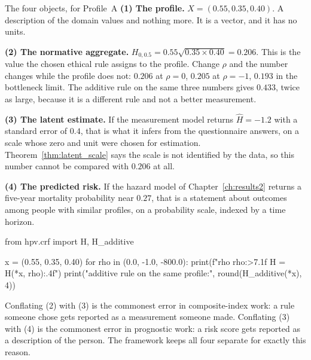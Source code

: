 \begin{workedexample}{The four objects, for Profile~A}
\textbf{(1) The profile.} $X=(0.55,0.35,0.40)$. A description of the domain
values and nothing more. It is a vector, and it has no units.

\textbf{(2) The normative aggregate.} $H_{0,0.5}=0.55\sqrt{0.35\times0.40}
=0.206$. This is the value the chosen ethical rule assigns to the profile.
Change $\rho$ and the number changes while the profile does not: $0.206$ at
$\rho=0$, $0.205$ at $\rho=-1$, $0.193$ in the bottleneck limit. The additive
rule on the same three numbers gives $0.433$, twice as large, because it is a
different rule and not a better measurement.

\textbf{(3) The latent estimate.} If the measurement model returns
$\widehat H=-1.2$ with a standard error of $0.4$, that is what it infers from
the questionnaire answers, on a scale whose zero and unit were chosen for
estimation. Theorem~\ref{thm:latent_scale} says the scale is not identified by
the data, so this number cannot be compared with $0.206$ at all.

\textbf{(4) The predicted risk.} If the hazard model of
Chapter~\ref{ch:results2} returns a five-year mortality probability near
$0.27$, that is a statement about outcomes among people with similar profiles, on
a probability scale, indexed by a time horizon.

\begin{wecode}[Python]
from hpv.crf import H, H_additive

x = (0.55, 0.35, 0.40)
for rho in (0.0, -1.0, -800.0):
    print(f"rho {rho:>7.1f}   H = {H(*x, rho):.4f}")
print("additive rule on the same profile:", round(H_additive(*x), 4))
\end{wecode}

\end{workedexample}

\begin{reading}
Conflating (2) with (3) is the commonest error in composite-index work: a rule
someone chose gets reported as a measurement someone made. Conflating (3) with
(4) is the commonest error in prognostic work: a risk score gets reported as a
description of the person. The framework keeps all four separate for exactly
this reason.
\end{reading}

